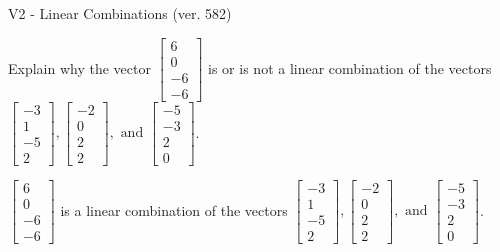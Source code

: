 \begin{exercise}
  \begin{exerciseTitle}V2 - Linear Combinations (ver. 582)\end{exerciseTitle}
  \begin{exerciseStatement}
    Explain why the vector \(\left[\begin{array}{c}
6 \\
0 \\
-6 \\
-6
\end{array}\right]\)  is or is not a linear 
	combination of the vectors \(\left[\begin{array}{c}
-3 \\
1 \\
-5 \\
2
\end{array}\right] , \left[\begin{array}{c}
-2 \\
0 \\
2 \\
2
\end{array}\right] , \text{ and } \left[\begin{array}{c}
-5 \\
-3 \\
2 \\
0
\end{array}\right]\).
	


  \end{exerciseStatement}
  \begin{exerciseAnswer}
   \(\left[\begin{array}{c}
6 \\
0 \\
-6 \\
-6
\end{array}\right]\) 
  	 is  
	a linear combination of the vectors \(\left[\begin{array}{c}
-3 \\
1 \\
-5 \\
2
\end{array}\right] , \left[\begin{array}{c}
-2 \\
0 \\
2 \\
2
\end{array}\right] , \text{ and } \left[\begin{array}{c}
-5 \\
-3 \\
2 \\
0
\end{array}\right]\).

	
  


  \end{exerciseAnswer}
\end{exercise}